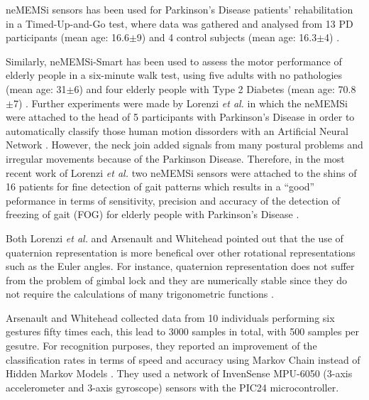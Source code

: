 \documentclass[11pt,journal,onecolumn,compsoc]{IEEEtran}
\begin{document}
neMEMSi sensors has been used for Parkinson's Disease patients' rehabilitation 
in a Timed-Up-and-Go test, where data was gathered and analysed from 
13 PD participants (mean age: 16.6$\pm$9) and 4 control subjects (mean age: 16.3$\pm$4) \cite{Caldara2014}.

Similarly, neMEMSi-Smart has been used to assess the motor performance of elderly people
in a six-minute walk test, using five adults with no pathologies (mean age: 31$\pm$6) and four elderly people with Type 2 Diabetes 
(mean age: 70.8$\pm$7) \cite{Caldara2015}.
Further experiments were made by Lorenzi \textit{et al.} in which the neMEMSi were attached to the head 
of 5 participants  with Parkinson's Disease in order to 
automatically classify those human motion dissorders with an Artificial Neural Network \cite{Lorenzi2015}.
However, the neck join added signals from many postural problems
and irregular movements because of the Parkinson Disease.
Therefore, in the most recent work of Lorenzi \textit{et al.} two neMEMSi sensors were attached to the shins
of 16 patients for fine detection of gait patterns
which results in a ``good'' peformance in terms of sensitivity, precision and accuracy of 
the detection of freezing of gait (FOG) for elderly people with Parkinson's Disease  \cite{Lorenzi2016}.

Both Lorenzi \textit{et al.} and Arsenault and Whitehead 
pointed out that the use of quaternion representation is more benefical over 
other rotational representations such as the Euler angles.
For instance, quaternion representation does not suffer from the problem of gimbal lock
and they are numerically stable 
since they do not require the calculations of many trigonometric functions \cite{Lorenzi2015, Arsenault2015_a, Munkundan2002}.

Arsenault and Whitehead collected data from 10 individuals performing six gestures fifty times each,
this lead to 3000 samples in total, with 500 samples per gesutre. 
For recognition purposes, they reported an improvement of the classification rates
in terms of speed and accuracy using Markov Chain instead of Hidden Markov Models \cite{Arsenault2015_a, Arsenault2015_b}.
They used a network of InvenSense MPU-6050 (3-axis accelerometer and 3-axis gyroscope) sensors with the  PIC24 microcontroller.
  
% 
% 
% 
% 
\end{document}

